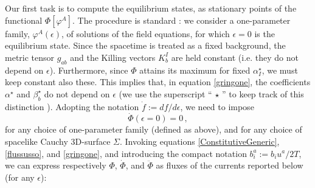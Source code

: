 \documentclass[a4paper, amsfonts, amssymb, amsmath, reprint, showkeys, nofootinbib, twoside, onecolumn, notitlepage]{revtex4-1}
\theoremstyle{definition}
\theoremstyle{theorem}
\begin{document}
Our first task is to compute the equilibrium states, as stationary points of the functional $\Phi[\varphi^A]$. The procedure is standard \cite{GavassinoStabilityCarter2022}: we consider a one-parameter family, $\varphi^A(\epsilon)$, of solutions of the field equations, for which $\epsilon=0$ is the equilibrium state. Since the spacetime is treated as  a fixed background, the metric tensor $g_{ab}$ and the Killing vectors $K^I_b$ are held constant (i.e. they do not depend on $\epsilon$). Furthermore, since $\Phi$ attains its maximum for fixed $\alpha^\star_I$, we must keep constant also these. This implies that, in equation \eqref{gringone}, the coefficients $\alpha^\star$ and $\beta^\star_b$ do not depend on $\epsilon$ (we use the superscript ``$\, \star \,$'' to keep track of this distinction \cite{Pathria2011}). Adopting the notation $\dot{f}:=df/d\epsilon$, we need to impose
\begin{equation}\label{staziono}
\dot{\Phi}(\epsilon=0)=0 \, ,
\end{equation}
for any choice of one-parameter family (defined as above), and for any choice of spacelike Cauchy 3D-surface $\Sigma$. Invoking equations \eqref{ConstitutiveGeneric}, \eqref{flussusso}, and \eqref{gringone}, and introducing the compact notation  $b^a_i := b_i u^a/2T$, we can express respectively $\Phi$, $\dot{\Phi}$, and $\ddot{\Phi}$ as fluxes of the currents reported below (for any $\epsilon$): 
\end{document}
